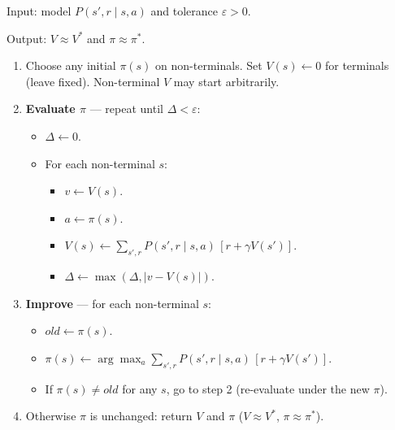 \begin{implnote}
Input: model $P(s',r\mid s,a)$ and tolerance $\varepsilon>0$.

Output: $V\approx V^*$ and $\pi\approx\pi^*$.

\begin{enumerate}
\item Choose any initial $\pi(s)$ on non-terminals. Set $V(s)\leftarrow 0$ for terminals (leave fixed). Non-terminal $V$ may start arbitrarily.
\item \textbf{Evaluate $\pi$} --- repeat until $\Delta<\varepsilon$:
\begin{itemize}
\item $\Delta\leftarrow 0$.
\item For each non-terminal $s$:
\begin{itemize}
\item $v\leftarrow V(s)$.
\item $a\leftarrow\pi(s)$.
\item $V(s)\leftarrow\sum_{s',r} P(s',r\mid s,a)\,[r+\gamma V(s')]$.
\item $\Delta\leftarrow\max(\Delta,|v-V(s)|)$.
\end{itemize}
\end{itemize}
\item \textbf{Improve} --- for each non-terminal $s$:
\begin{itemize}
\item $\textit{old}\leftarrow\pi(s)$.
\item $\pi(s)\leftarrow\arg\max_a\sum_{s',r} P(s',r\mid s,a)\,[r+\gamma V(s')]$.
\item If $\pi(s)\neq\textit{old}$ for any $s$, go to step 2 (re-evaluate under the new $\pi$).
\end{itemize}
\item Otherwise $\pi$ is unchanged: return $V$ and $\pi$ ($V\approx V^*$, $\pi\approx\pi^*$).
\end{enumerate}

\end{implnote}



